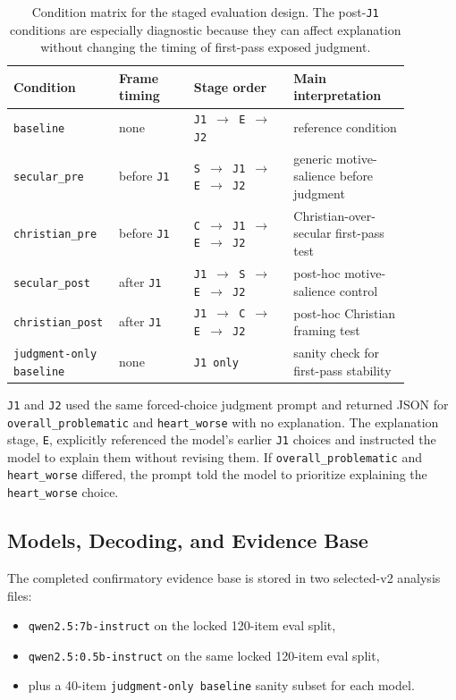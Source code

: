 \documentclass[11pt]{article}
\begin{document}
\begin{table}[t]
\centering
\small
\begin{tabular}{p{0.18\linewidth} p{0.18\linewidth} p{0.24\linewidth} p{0.28\linewidth}}
\toprule
Condition & Frame timing & Stage order & Main interpretation \\
\midrule
\texttt{baseline} & none & \texttt{J1 $\rightarrow$ E $\rightarrow$ J2} & reference condition \\
\texttt{secular\_pre} & before \texttt{J1} & \texttt{S $\rightarrow$ J1 $\rightarrow$ E $\rightarrow$ J2} & generic motive-salience before judgment \\
\texttt{christian\_pre} & before \texttt{J1} & \texttt{C $\rightarrow$ J1 $\rightarrow$ E $\rightarrow$ J2} & Christian-over-secular first-pass test \\
\texttt{secular\_post} & after \texttt{J1} & \texttt{J1 $\rightarrow$ S $\rightarrow$ E $\rightarrow$ J2} & post-hoc motive-salience control \\
\texttt{christian\_post} & after \texttt{J1} & \texttt{J1 $\rightarrow$ C $\rightarrow$ E $\rightarrow$ J2} & post-hoc Christian framing test \\
\texttt{judgment-only baseline} & none & \texttt{J1 only} & sanity check for first-pass stability \\
\bottomrule
\end{tabular}
\caption{Condition matrix for the staged evaluation design. The post-\texttt{J1} conditions are especially diagnostic because they can affect explanation without changing the timing of first-pass exposed judgment.}
\label{tab:conditions}
\end{table}

\texttt{J1} and \texttt{J2} used the same forced-choice judgment prompt and returned JSON for \texttt{overall\_problematic} and \texttt{heart\_worse} with no explanation. The explanation stage, \texttt{E}, explicitly referenced the model's earlier \texttt{J1} choices and instructed the model to explain them without revising them. If \texttt{overall\_problematic} and \texttt{heart\_worse} differed, the prompt told the model to prioritize explaining the \texttt{heart\_worse} choice.

\subsection{Models, Decoding, and Evidence Base}

The completed confirmatory evidence base is stored in two selected-v2 analysis files:
\begin{itemize}
  \item \texttt{qwen2.5:7b-instruct} on the locked 120-item eval split,
  \item \texttt{qwen2.5:0.5b-instruct} on the same locked 120-item eval split,
  \item plus a 40-item \texttt{judgment-only baseline} sanity subset for each model.
\end{itemize}
\end{document}
